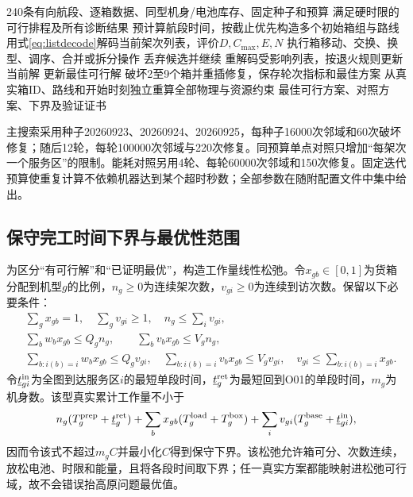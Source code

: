 \documentclass[a4paper]{my_paper}%
\numberwithin{equation}{section}
\theoremstyle{definition}
\begin{document}
\begin{algorithm}[htbp]
\caption{多起点运输邻域搜索与资源时序解码}\label{alg:q2}
\begin{algorithmic}[1]
\Require 240条有向航段、逐箱数据、同型机身/电池库存、固定种子和预算
\Ensure 满足硬时限的可行排程及所有诊断结果
\State 预计算航段时间，按截止优先构造多个初始箱组与路线
 \State 用式\eqref{eq:listdecode}解码当前架次列表，评价$D,C_{\max},E,N$
  \State 执行箱移动、交换、换型、调序、合并或拆分操作
  \State 丢弃候选并继续\EndIf
  \State 重解码受影响列表，按退火规则更新当前解
  \State 更新最佳可行解\EndIf
 \EndFor
 \State 破坏2至9个箱并重插修复，保存轮次指标和最佳方案
\EndFor
\State 从真实箱ID、路线和开始时刻独立重算全部物理与资源约束
\State \Return 最佳可行方案、对照方案、下界及验证证书
\end{algorithmic}
\end{algorithm}

主搜索采用种子20260923、20260924、20260925，每种子16000次邻域和60次破坏修复；随后12轮，每轮100000次邻域与220次修复。同预算单点对照只增加“每架次一个服务区”的限制。能耗对照另用4轮、每轮60000次邻域和150次修复。固定迭代预算使重复计算不依赖机器达到某个超时秒数；全部参数在随附配置文件中集中给出。

\subsection{保守完工时间下界与最优性范围}
为区分“有可行解”和“已证明最优”，构造工作量线性松弛。令$x_{gb}\in[0,1]$为货箱分配到机型$g$的比例，$n_g\ge0$为连续架次数，$v_{gi}\ge0$为连续到访次数。保留以下必要条件：
\begin{align}
 &\sum_gx_{gb}=1,\quad \sum_gv_{gi}\ge1,\quad n_g\le\sum_i v_{gi}, \label{eq:lp1}\\
 &\sum_bw_bx_{gb}\le Q_g n_g,\qquad \sum_bv_bx_{gb}\le V_g n_g, \label{eq:lp2}\\
 &\sum_{b:i(b)=i}w_bx_{gb}\le Q_gv_{gi},\quad
 \sum_{b:i(b)=i}v_bx_{gb}\le V_gv_{gi},\quad
 v_{gi}\le\sum_{b:i(b)=i}x_{gb}. \label{eq:lp3}
\end{align}
令$\underline t_{gi}^{\rm in}$为全图到达服务区$i$的最短单段时间，$\underline t_g^{\rm ret}$为最短回到O01的单段时间，$m_g$为机身数。该型真实累计工作量不小于
\begin{equation}
 n_g(T_g^{\rm prep}+\underline t_g^{\rm ret})
 +\sum_bx_{gb}(T_g^{\rm load}+T_g^{\rm box})
 +\sum_i v_{gi}(T_g^{\rm base}+\underline t_{gi}^{\rm in}),
 \label{eq:lpwork}
\end{equation}
因而令该式不超过$m_gC$并最小化$C$得到保守下界。该松弛允许箱可分、次数连续，放松电池、时限和能量，且将各段时间取下界；任一真实方案都能映射进松弛可行域，故不会错误抬高原问题最优值。
\end{document}

